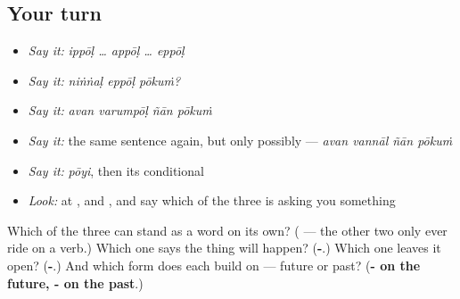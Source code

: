 \subsection*{Your turn}
\begin{itemize}
\raggedright
  \item \emph{Say it:} \emph{ippōḷ … appōḷ … eppōḷ}
  \item \emph{Say it:} \emph{niṅṅaḷ eppōḷ pōkuṁ?}
  \item \emph{Say it:} \emph{avan varumpōḷ ñān pōkuṁ}
  \item \emph{Say it:} the same sentence again, but only possibly — \emph{avan vannāl ñān pōkuṁ}
  \item \emph{Say it:} \emph{pōyi}, then its conditional
  \item \emph{Look:} at \textbf{}, \textbf{} and \textbf{}, and say which of the three is asking you something
\end{itemize}

\begin{tcolorbox}[breakable,colback=teal!4,colframe=teal!35!black,title={Before you move on}]
Which of the three can stand as a word on its own? (\textbf{} — the other two only ever ride on a verb.) Which one says the thing will happen? (\textbf{-}.) Which one leaves it open? (\textbf{-}.) And which form does each build on — future or past? (\textbf{- on the future, - on the past}.)
\end{tcolorbox}
